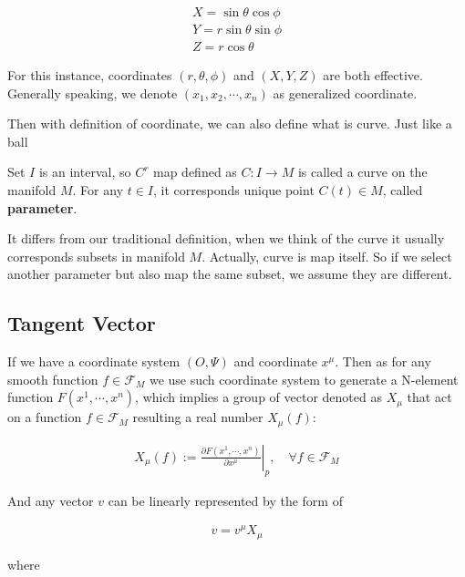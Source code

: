 \begin{align}
    X=\sin \theta\cos \phi\\
    Y=r\sin \theta\sin \phi\\
    Z=r\cos\theta
\end{align}

For this instance, coordinates $(r,\theta,\phi)$ and $(X,Y,Z)$ are both effective. Generally speaking, we denote $(x_{1},x_{2},\cdots,x_{n})$ as generalized coordinate. 

Then with definition of coordinate, we can also define what is curve. Just like a ball

\begin{tcolorbox}[title=\textbf{Curve},colback=SeaGreen!10!CornflowerBlue!10,colframe=RoyalPurple!55!Aquamarine!100!]
    Set $I$ is an interval, so $C^{r}$ map defined as $C:I\rightarrow M$ is called a curve on the manifold $M$. For any $t\in I$, it corresponds unique point $C(t)\in M$, called \textbf{parameter}.
\end{tcolorbox}

It differs from our traditional definition, when we think of the curve it usually corresponds subsets in manifold $M$. Actually, curve is map itself. So if we select another parameter but also map the same subset, we assume they are different. 




\subsection{Tangent Vector}

If we have a coordinate system $(O,\Psi)$ and coordinate $x^{\mu}$. Then as for any smooth function $f\in \mathscr{F}_{M}$ we use such coordinate system to generate a N-element function $F(x^{1},\cdots, x^{n})$, which implies a group of vector denoted as $X_{\mu}$ that act on a function $f\in \mathscr{F}_{M}$ resulting a real number $X_{\mu}(f)$:

\begin{align}
    X_{\mu}(f):=\left.\frac{\partial F(x^{1},\cdots, x^{n})}{\partial x^{\mu}}\right|_{p}, \quad \forall f\in \mathscr{F}_{M}
\end{align}

And any vector $v$ can be linearly represented by the form of 

\begin{align}
    v=v^{\mu}X_{\mu}
\end{align}

where 

